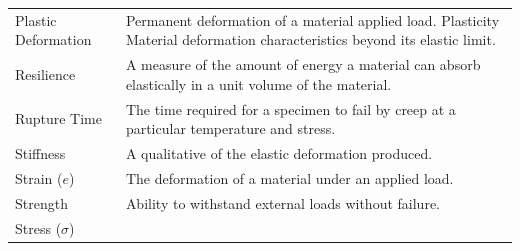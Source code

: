 \documentclass[
]{book}
\begin{document}
\begin{longtable}[]{@{}ll@{}}
\begin{minipage}[t]{0.14\columnwidth}
Plastic Deformation\strut
\end{minipage} & \begin{minipage}[t]{0.80\columnwidth}\raggedright
Permanent deformation of a material applied load. Plasticity Material deformation characteristics beyond its elastic limit.\strut
\end{minipage}\tabularnewline
\begin{minipage}[t]{0.14\columnwidth}\raggedright
Resilience\strut
\end{minipage} & \begin{minipage}[t]{0.80\columnwidth}\raggedright
A measure of the amount of energy a material can absorb elastically in a unit volume of the material.\strut
\end{minipage}\tabularnewline
\begin{minipage}[t]{0.14\columnwidth}\raggedright
Rupture Time\strut
\end{minipage} & \begin{minipage}[t]{0.80\columnwidth}\raggedright
The time required for a specimen to fail by creep at a particular temperature and stress.\strut
\end{minipage}\tabularnewline
\begin{minipage}[t]{0.14\columnwidth}\raggedright
Stiffness\strut
\end{minipage} & \begin{minipage}[t]{0.80\columnwidth}\raggedright
A qualitative of the elastic deformation produced.\strut
\end{minipage}\tabularnewline
\begin{minipage}[t]{0.14\columnwidth}\raggedright
Strain (\(e\))\strut
\end{minipage} & \begin{minipage}[t]{0.80\columnwidth}\raggedright
The deformation of a material under an applied load.\strut
\end{minipage}\tabularnewline
\begin{minipage}[t]{0.14\columnwidth}\raggedright
Strength\strut
\end{minipage} & \begin{minipage}[t]{0.80\columnwidth}\raggedright
Ability to withstand external loads without failure.\strut
\end{minipage}\tabularnewline
\begin{minipage}[t]{0.14\columnwidth}\raggedright
Stress (\(\sigma\))\strut
\end{minipage} & \begin{minipage}[t]{0.80\columnwidth}\raggedright

\end{minipage}
\end{longtable}
\end{document}
